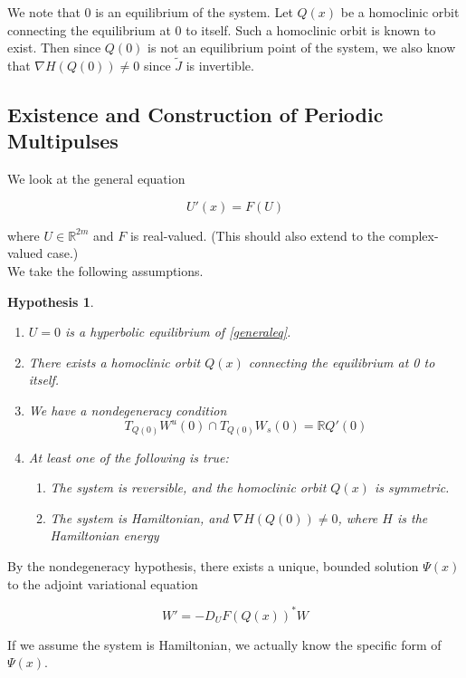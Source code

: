 \documentclass[12pt]{article}
\def\R{{\mathbb R}}
\newtheorem{hypothesis}{Hypothesis}
\begin{document}
We note that 0 is an equilibrium of the system. Let $Q(x)$ be a homoclinic orbit connecting the equilibrium at 0 to itself. Such a homoclinic orbit is known to exist. Then since $Q(0)$ is not an equilibrium point of the system, we also know that $\nabla H(Q(0)) \neq 0$ since $\tilde{J}$ is invertible.

\subsection{Existence and Construction of Periodic Multipulses}

We look at the general equation

\begin{equation}\label{generaleq}
U'(x) = F(U)
\end{equation}

where $U \in \R^{2m}$ and $F$ is real-valued. (This should also extend to the complex-valued case.)\\

We take the following assumptions.

\begin{hypothesis}\label{assumptions}
\[\]
\begin{enumerate}
	\item $U = 0$ is a hyperbolic equilibrium of \eqref{generaleq}.
	\item There exists a homoclinic orbit $Q(x)$ connecting the equilibrium at 0 to itself.
	\item We have a nondegeneracy condition
	\[
	T_{Q(0)} W^u(0) \cap T_{Q(0)} W_s(0) = \R Q'(0)
	\]
	\item At least one of the following is true:
	\begin{enumerate}
		\item The system is reversible, and the homoclinic orbit $Q(x)$ is symmetric.
		\item The system is Hamiltonian, and $\nabla H(Q(0)) \neq 0$, where $H$ is the Hamiltonian energy
	\end{enumerate}
\end{enumerate}
\end{hypothesis}

By the nondegeneracy hypothesis, there exists a unique, bounded solution $\Psi(x)$ to the adjoint variational equation

\begin{equation}
W' = -D_U F(Q(x))^* W
\end{equation}

If we assume the system is Hamiltonian, we actually know the specific form of $\Psi(x)$.
\end{document}
